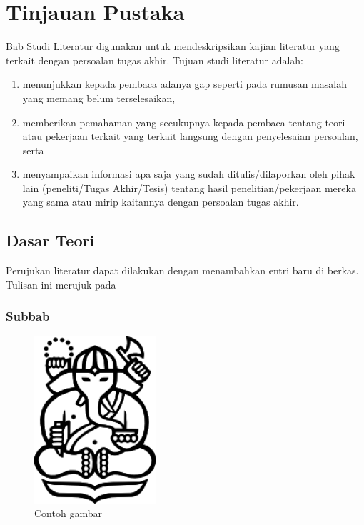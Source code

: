 \chapter{Tinjauan Pustaka}

Bab Studi Literatur digunakan untuk mendeskripsikan kajian literatur yang terkait dengan persoalan tugas akhir. Tujuan studi literatur adalah:

\begin{enumerate}
    \item menunjukkan kepada pembaca adanya gap seperti pada rumusan masalah yang memang belum terselesaikan,
    \item memberikan pemahaman yang secukupnya kepada pembaca tentang teori atau pekerjaan terkait yang terkait langsung dengan penyelesaian persoalan, serta
    \item menyampaikan informasi apa saja yang sudah ditulis/dilaporkan oleh pihak lain (peneliti/Tugas Akhir/Tesis) tentang hasil penelitian/pekerjaan mereka yang sama atau mirip kaitannya dengan persoalan tugas akhir.
\end{enumerate}

\blindtext

\blindtext

\section{Dasar Teori}
Perujukan literatur dapat dilakukan dengan menambahkan entri baru di berkas. Tulisan ini merujuk pada \parencite{knuth2001art}

    \subsection{Subbab}

    \blindtext

    \begin{figure}[h]
        \centering
        \includegraphics[width=0.4\textwidth]{resources/itb_logo.png}
        \caption{Contoh gambar}
    \end{figure}
	
